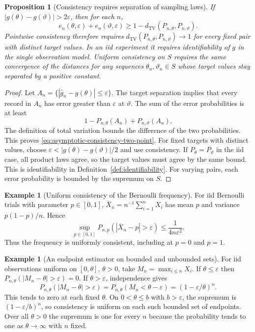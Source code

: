 \documentclass[11pt,oneside]{book}
\newtheorem{proposition}[theorem]{Proposition}
\theoremstyle{definition}
\newtheorem{example}[theorem]{Example}
\theoremstyle{remark}
\begin{document}
\begin{proposition}[Consistency requires separation of sampling laws]
\label{prop:asymptotic-consistency-separation}
If $|g(\theta)-g(\vartheta)|>2\varepsilon$, then for each $n$,
\begin{equation}
e_n(\theta,\varepsilon)+e_n(\vartheta,\varepsilon)
\geq 1-d_{\mathrm{TV}}(P_{n,\theta},P_{n,\vartheta}).
\label{eq:asymptotic-consistency-two-point}
\end{equation}
Pointwise consistency therefore requires
$d_{\mathrm{TV}}(P_{n,\theta},P_{n,\vartheta})\to1$ for every fixed
pair with distinct target values. In an iid experiment it
requires identifiability of $g$ in the single observation model.
Uniform consistency on $S$ requires the same convergence of the
distances for any sequences $\theta_n,\vartheta_n\in S$ whose
target values stay separated by a positive constant.
\end{proposition}
\begin{proof}
Let $A_n=\{|\widehat g_n-g(\theta)|\leq\varepsilon\}$. The target
separation implies that every record in $A_n$ has error greater
than $\varepsilon$ at $\vartheta$. The sum of the error probabilities
is at least
\[
1-P_{n,\theta}(A_n)+P_{n,\vartheta}(A_n).
\]
The definition of total variation bounds the difference of the
two probabilities. This proves \eqref{eq:asymptotic-consistency-two-point}.
For fixed targets with distinct values, choose
$\varepsilon<|g(\theta)-g(\vartheta)|/2$ and use consistency.
If $P_\theta=P_\vartheta$ in the iid case, all product laws
agree, so the target values must agree by the same bound. This is
identifiability in Definition~\ref{def:identifiability}.
For varying pairs, each error probability is bounded by the
supremum on $S$.
\end{proof}

\begin{example}[Uniform consistency of the Bernoulli frequency]
\label{ex:asymptotic-consistency-bernoulli}
For iid Bernoulli trials with parameter $p\in[0,1]$,
$\bar X_n=n^{-1}\sum_{i=1}^nX_i$ has mean $p$ and
variance $p(1-p)/n$. Hence
\[
\sup_{p\in[0,1]}P_{n,p}(|\bar X_n-p|>\varepsilon)
\leq \frac{1}{4n\varepsilon^2}.
\]
Thus the frequency is uniformly consistent, including at
$p=0$ and $p=1$.
\end{example}

\begin{example}[An endpoint estimator on bounded and unbounded sets]
\label{ex:asymptotic-consistency-uniform-endpoint}
For iid observations uniform on $[0,\theta]$, $\theta>0$,
take $M_n=\max_{i\leq n}X_i$. If $\theta\leq\varepsilon$ then
$P_{n,\theta}(|M_n-\theta|>\varepsilon)=0$. If
$\theta>\varepsilon$, independence gives
\[
P_{n,\theta}(|M_n-\theta|>\varepsilon)
=P_{n,\theta}(M_n<\theta-\varepsilon)
=(1-\varepsilon/\theta)^n .
\]
This tends to zero at each fixed $\theta$. On $0<\theta\leq b$
with $b>\varepsilon$, the supremum is $(1-\varepsilon/b)^n$,
so consistency is uniform on each such bounded set of endpoints.
Over all $\theta>0$ the supremum is one for every $n$ because the
probability tends to one as $\theta\to\infty$ with $n$ fixed.
\end{example}
\end{document}
